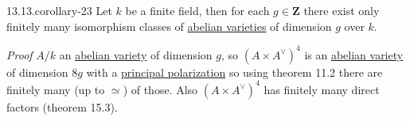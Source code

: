 \documentclass[10pt,]{book}
\makeatletter
\renewcommand*{\proofname}{Proof}
\renewenvironment{proof}[1][\proofname]{\par
  \pushQED{\qed}%
  \normalfont \topsep6\p@\@plus6\p@\relax
  \trivlist
  \item\relax
    {\itshape
    #1\@addpunct{.}}\hspace\labelsep\ignorespaces
}{%
  \popQED\endtrivlist\@endpefalse
}
\numberwithin{equation}{section}
\newcommand{\ZZ}{\mathbf{Z}}
\makeatother
\begin{document}
\begin{corollary}{13.13.}{}{corollary-23}%
\hypertarget{p-329}{}%
Let \(k\) be a finite field, then for each \(g \in \ZZ\) there exist only finitely many isomorphism classes of \hyperref[def-buntes-abvar]{abelian varieties} of dimension \(g\) over \(k\).%
\end{corollary}
\begin{proof}\hypertarget{proof-56}{}
\hypertarget{p-330}{}%
\(A/k\) an \hyperref[def-buntes-abvar]{abelian variety} of dimension \(g\), so \((A\times A^\vee)^4\) is an \hyperref[def-buntes-abvar]{abelian variety} of dimension \(8g\) with a \hyperref[def-polarization]{principal polarization} so using theorem 11.2 there are finitely many (up to \(\simeq\)) of those. Also \((A\times A^\vee)^4\) has finitely many direct factors (theorem 15.3).%
\end{proof}
%
%
\typeout{************************************************}
\typeout{************************************************}
%
\end{document}
